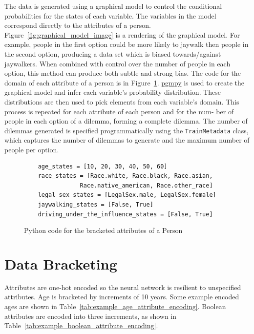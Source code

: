 \documentclass{report}
\newcommand{\code}{\texttt}
\begin{document}
The data is generated using a graphical model to control the conditional probabilities for the
states of each variable. The variables in the model correspond directly to the attributes of a
person. Figure~\ref{fig:graphical_model_image} is a rendering of the graphical model. For example,
people in the first option could be more likely to jaywalk then people in the second option,
producing a data set which is biased towards/against jaywalkers. When combined with control over the
number of people in each option, this method can produce both subtle and strong bias. The code for
the domain of each attribute of a person is in Figure~\ref{fig:code_for_person_attribute_domains}.
\href{https://github.com/pgmpy/pgmpy}{pgmpy} is used to create the graphical model and infer each
variable’s probability distribution. These distributions are then used to pick elements from each
variable’s domain. This process is repeated for each attribute of each person and for the num- ber
of people in each option of a dilemma, forming a complete dilemma. The number of dilemmas generated
is specified programmatically using the \code{TrainMetadata} class, which captures the number of
dilemmas to generate and the maximum number of people per option.

\begin{figure}[h]
    \centering
    \begin{verbatim}
    age_states = [10, 20, 30, 40, 50, 60]
    race_states = [Race.white, Race.black, Race.asian,
                Race.native_american, Race.other_race]
    legal_sex_states = [LegalSex.male, LegalSex.female]
    jaywalking_states = [False, True]
    driving_under_the_influence_states = [False, True]
    \end{verbatim}
    \caption{Python code for the bracketed attributes of a Person}
    \label{fig:code_for_person_attribute_domains}
\end{figure}

\FloatBarrier
\section{Data Bracketing}

Attributes are one-hot encoded so the neural network is resilient to unspecified attributes. Age is
bracketed by increments of 10 years. Some example encoded ages are shown in
Table~\ref{tab:example_age_attribute_encoding}. Boolean attributes are encoded into three
increments, as shown in Table~\ref{tab:example_boolean_attribute_encoding}.
    
\end{document}
